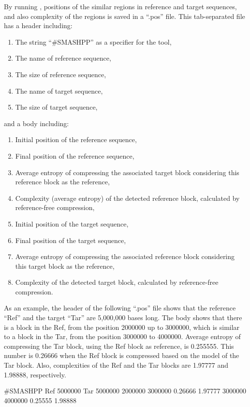 \documentclass[a4paper,9pt]{extarticle}
\begin{document}
By running \smashpp, positions of the similar regions in reference and target sequences, and also complexity of the regions is saved in a ``.pos'' file. This tab-separated file has a header including:
\begin{enumerate}
  \item The string ``\#SMASHPP'' as a specifier for the \smashpp tool,
  \item The name of reference sequence,
  \item The size of reference sequence,
  \item The name of target sequence,
  \item The size of target sequence,
\end{enumerate}
and a body including:
\begin{enumerate}
  \item Initial position of the reference sequence,
  \item Final position of the reference sequence,
  \item Average entropy of compressing the associated target block considering this reference block as the reference,
  \item Complexity (average entropy) of the detected reference block, calculated by reference-free compression,
  \item Initial position of the target sequence,
  \item Final position of the target sequence,
  \item Average entropy of compressing the associated reference block considering this target block as the reference,
  \item Complexity of the detected target block, calculated by reference-free compression.
\end{enumerate}
As an example, the header of the following ``.pos'' file shows that the reference ``Ref'' and the target ``Tar'' are 5,000,000 bases long. The body shows that there is a block in the Ref, from the position 2000000 up to 3000000, which is similar to a block in the Tar, from the position 3000000 to 4000000. Average entropy of compressing the Tar block, using the Ref block as reference, is 0.255555. This number is 0.26666 when the Ref block is compressed based on the model of the Tar block. Also, complexities of the Ref and the Tar blocks are 1.97777 and 1.98888, respectively.
\begin{code}[style=bash]
#SMASHPP Ref      5000000  Tar      5000000
2000000	 3000000  0.26666  1.97777  3000000  4000000  0.25555 1.98888
\end{code}
\end{document}
